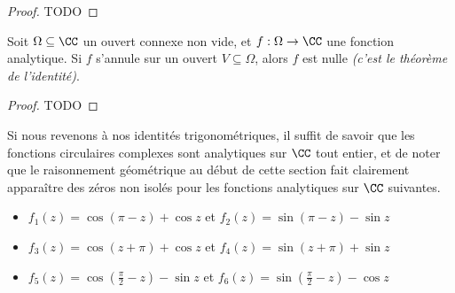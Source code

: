 \begin{proof}
	TODO
\end{proof}




\begin{fact} \label{analytic-identity}
    Soit $\Omega \subseteq \CC$ un ouvert connexe non vide,
    et
    $f: \Omega \rightarrow \CC$ une fonction analytique.
	Si $f$ s'annule sur un ouvert $V \subseteq \Omega$,
	alors $f$ est nulle
	\emph{(c'est le théorème de l'identité)}.  
\end{fact}


\begin{proof}
	TODO
\end{proof}




Si nous revenons à nos identités trigonométriques, il suffit de savoir que les fonctions circulaires complexes sont analytiques sur $\CC$ tout entier, et de noter que le raisonnement géométrique au début de cette section fait clairement apparaître des zéros non isolés pour les fonctions analytiques sur $\CC$ suivantes.
%
\begin{itemize}[label=\small\textbullet]
	\item $f_1(z) = \cos (\pi - z) + \cos z$ 
	   et $f_2(z) = \sin (\pi - z) - \sin z$ 

	\smallskip
	\item $f_3(z) =\cos (z + \pi) + \cos z$ 
	   et $f_4(z) =\sin (z + \pi) + \sin z$

	\smallskip
	\item $f_5(z) =\cos \left( \frac{\pi}{2} - z \right) - \sin z$ 
	   et $f_6(z) =\sin \left( \frac{\pi}{2} - z \right) - \cos z$ 
\end{itemize}








